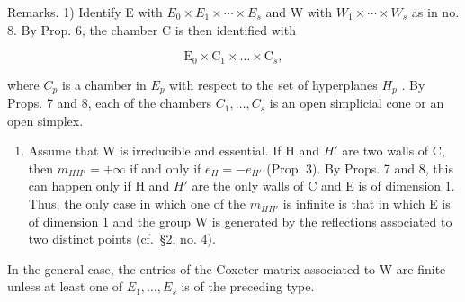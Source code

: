 Remarks. 1) Identify E with \(E_{0} \times E_{1} \times \cdots \times E_{s}\) and W with \(W_{1} \times \cdots \times W_{s}\) as in no. 8. By Prop. 6, the chamber C is then identified with

\[
\mathrm{E} _ {0} \times \mathrm{C} _ {1} \times \dots \times \mathrm{C} _ {s},
\]

where \(C_{p}\) is a chamber in \(E_{p}\) with respect to the set of hyperplanes \(H_{p}\) . By Props. 7 and 8, each of the chambers \(C_{1},\ldots,C_{s}\) is an open simplicial cone or an open simplex.

\begin{enumerate}
\def\labelenumi{\arabic{enumi})}
\setcounter{enumi}{1}
\tightlist
\item
  Assume that W is irreducible and essential. If H and \(H'\) are two walls of C, then \(m_{HH'} = +\infty\) if and only if \(e_{H} = -e_{H'}\) (Prop. 3). By Props. 7 and 8, this can happen only if H and \(H'\) are the only walls of C and E is of dimension 1. Thus, the only case in which one of the \(m_{HH'}\) is infinite is that in which E is of dimension 1 and the group W is generated by the reflections associated to two distinct points (cf.~§2, no. 4).
\end{enumerate}

In the general case, the entries of the Coxeter matrix associated to W are finite unless at least one of \(E_{1},\ldots,E_{s}\) is of the preceding type.

